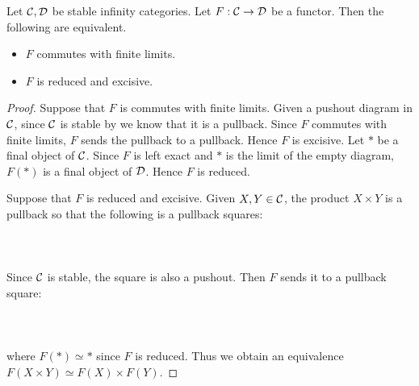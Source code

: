\begin{prp}\label{prp:RedExiffLE} Let $\mathcal{C},\mathcal{D}$ be stable infinity categories. Let $F:\mathcal{C}\to\mathcal{D}$ be a functor. Then the following are equivalent. 
\begin{itemize}
\item $F$ commutes with finite limits. 
\item $F$ is reduced and excisive. 
\end{itemize} 
\begin{proof}
Suppose that $F$ is commutes with finite limits. Given a pushout diagram in $\mathcal{C}$, since $\mathcal{C}$ is stable by we know that it is a pullback. Since $F$ commutes with finite limits, $F$ sends the pullback to a pullback. Hence $F$ is excisive. Let $\ast$ be a final object of $\mathcal{C}$. Since $F$ is left exact and $\ast$ is the limit of the empty diagram, $F(\ast)$ is a final object of $\mathcal{D}$. Hence $F$ is reduced. 

Suppose that $F$ is reduced and excisive. Given $X,Y\in\mathcal{C}$, the product $X\times Y$ is a pullback so that the following is a pullback squares:  
 \\~\\  \\~\\
Since $\mathcal{C}$ is stable, the square is also a pushout. Then $F$ sends it to a pullback square:  
 \\~\\  \\~\\
where $F(\ast)\simeq\ast$ since $F$ is reduced. Thus we obtain an equivalence $F(X\times Y)\simeq F(X)\times F(Y)$.


\end{proof}
\end{prp}
